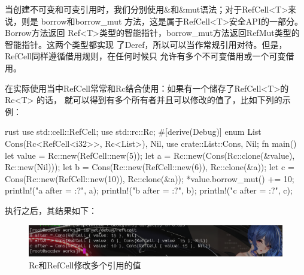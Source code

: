 当创建不可变和可变引用时，我们分别使用\&和\&mut语法；对于RefCell<T>来说，则是
borrow和borrow\_mut 方法，这是属于RefCell<T>安全API的一部分。Borrow方法返回
Ref<T>类型的智能指针，borrow\_mut方法返回RefMut类型的智能指针。这两个类型都实现
了Deref，所以可以当作常规引用对待。但是，RefCell同样遵循借用规则，在任何时候只
允许有多个不可变借用或一个可变借用。

在实际使用当中RefCell常常和Rc结合使用：如果有一个储存了RefCell<T>的 Rc<T> 的话，
就可以得到有多个所有者并且可以修改的值了，比如下列的示例：
\begin{code-block}{rust}
use std::cell::RefCell;
use std::rc::Rc;
#[derive(Debug)]
enum List {
    Cons(Rc<RefCell<i32>>, Rc<List>),
    Nil,
}
use crate::List::{Cons, Nil};
fn main() {
    let value = Rc::new(RefCell::new(5));
    let a = Rc::new(Cons(Rc::clone(&value), Rc::new(Nil)));
    let b = Cons(Rc::new(RefCell::new(6)), Rc::clone(&a));
    let c = Cons(Rc::new(RefCell::new(10)), Rc::clone(&a));
    *value.borrow_mut() += 10;
    println!("a after = {:?}", a);
    println!("b after = {:?}", b);
    println!("c after = {:?}", c);
}
\end{code-block}
执行之后，其结果如下：
\begin{figure}[H]
  \centering
  \includegraphics[width=\linewidth]{rust_ref_cell.png}
  \caption{Rc和RefCell修改多个引用的值}
  \label{fig:rust_ref_cell}
\end{figure}

